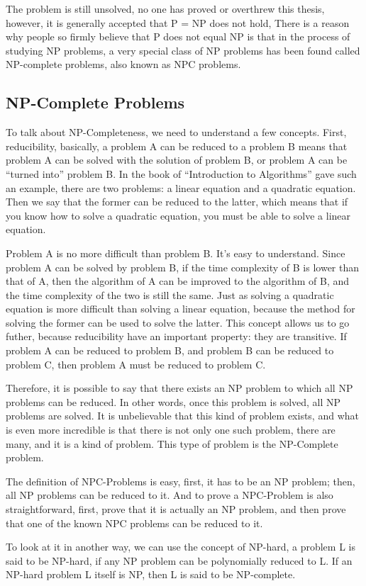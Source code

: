 The problem is still unsolved, no one has proved or overthrew this thesis, however, it is generally accepted that P = NP does not hold,  
There is a reason why people so firmly believe that P does not equal NP is that in the process of studying NP problems, a very special 
class of NP problems has been found called NP-complete problems, also known as NPC problems.

\subsection{ NP-Complete Problems}

To talk about NP-Completeness, we need to understand a few concepts. First, reducibility, basically, a problem A can 
be reduced to a problem B means that problem A can be solved with the solution of problem B, or problem A can be 
``turned into'' problem B. In the book of ``Introduction to Algorithms'' gave such an example, there are two problems: 
a linear equation and a quadratic equation. Then we say that the former can be reduced to the latter, which means that 
if you know how to solve a quadratic equation, you must be able to solve a linear equation. 

Problem A is no more difficult than problem B. It's easy to understand. Since problem A can be solved by problem B, 
if the time complexity of B is lower than that of A, then the algorithm of A can be improved to the algorithm of B, 
and the time complexity of the two is still the same. Just as solving a quadratic equation is more difficult than 
solving a linear equation, because the method for solving the former can be used to solve the latter. This concept allows
us to  go futher, because reducibility have an important property: they are transitive. If problem A can be reduced to 
problem B, and problem B can be reduced to problem C, then problem A must be reduced to problem C. 

Therefore, it is possible to say that there exists an NP problem to which all NP problems can be reduced. In other 
words, once this problem is solved, all NP problems are solved. It is unbelievable that this kind of problem exists, 
and what is even more incredible is that there is not only one such problem, there are many, and it is a kind of 
problem. This type of problem is the NP-Complete problem.

The definition of NPC-Problems is easy, first, it has to be an NP problem; then, all NP problems can be reduced to it.
And to prove a NPC-Problem is also straightforward, first, prove that it is actually an NP problem, and then prove 
that one of the known NPC problems can be reduced to it.

To look at it in another way, we can use the concept of NP-hard, a problem L is said to be NP-hard, if any NP problem 
can be polynomially reduced to L. If an NP-hard problem L itself is NP, then L is said to be NP-complete. 

